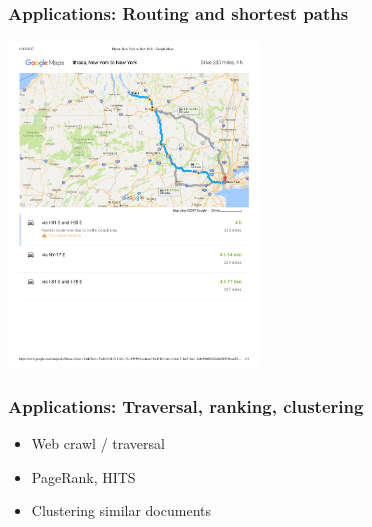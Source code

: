 \documentclass{beamer}
\begin{document}
\begin{frame}
  \frametitle{Applications: Routing and shortest paths}

  \begin{center}
    \includegraphics[width=0.5\textwidth]{figs/ithaca2nyc.pdf}
  \end{center}
\end{frame}

\begin{frame}
  \frametitle{Applications: Traversal, ranking, clustering}

  \begin{center}
    
  \end{center}

  \begin{itemize}
    \item Web crawl / traversal
    \item PageRank, HITS
    \item Clustering similar documents
  \end{itemize}
\end{frame}
\end{document}
